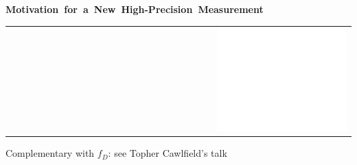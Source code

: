 \documentclass[landscape]{article}
\newenvironment{slide}[1][ ]{\mbox{\bf #1 } \vfill}{\vfill \mbox{ } \hfill \Large \arabic{page} \pagebreak}
\begin{document}
\begin{slide}[Motivation for a New High-Precision Measurement]
\begin{tabular}{p{0.6\linewidth} p{0.4\linewidth}}
\begin{minipage}{\linewidth}
  \end{minipage} &
  \begin{minipage}{\linewidth}
    \includegraphics[width=\linewidth]{ckm04-white}
  \end{minipage}
\end{tabular}

\vspace{0.5 cm}
{\color{white} Complementary with $f_D$: see Topher Cawlfield's talk}

\end{slide}

\addtocounter{page}{-1}
\end{document}
